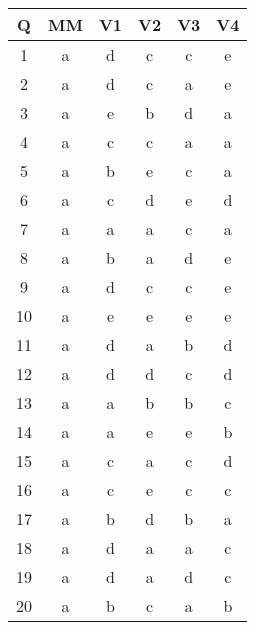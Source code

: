 \renewcommand{\thepage}{\noindent VAR_COURSE_CODE, VAR_TERM, VAR_EXAM_TITLE \hfill {\bf \fbox{Answer KEY}}}
\begin{normalsize}
\setcounter{page}{1}
\vspace {1cm}


\begin{center}
\begin{tabular}{|c||c|c|c|c|c|}
\hline
Q & MM & V1& V2& V3& V4\\
\hline \hline
1 & a  & d & c & c & e \\ \hline
2 & a  & d & c & a & e \\ \hline
3 & a  & e & b & d & a \\ \hline
4 & a  & c & c & a & a \\ \hline
5 & a  & b & e & c & a \\ \hline
6 & a  & c & d & e & d \\ \hline
7 & a  & a & a & c & a \\ \hline
8 & a  & b & a & d & e \\ \hline
9 & a  & d & c & c & e \\ \hline
10 & a  & e & e & e & e \\ \hline
11 & a  & d & a & b & d \\ \hline
12 & a  & d & d & c & d \\ \hline
13 & a  & a & b & b & c \\ \hline
14 & a  & a & e & e & b \\ \hline
15 & a  & c & a & c & d \\ \hline
16 & a  & c & e & c & c \\ \hline
17 & a  & b & d & b & a \\ \hline
18 & a  & d & a & a & c \\ \hline
19 & a  & d & a & d & c \\ \hline
20 & a  & b & c & a & b \\ \hline
\end{tabular}
\end{center}
\end{normalsize}
\newpage

